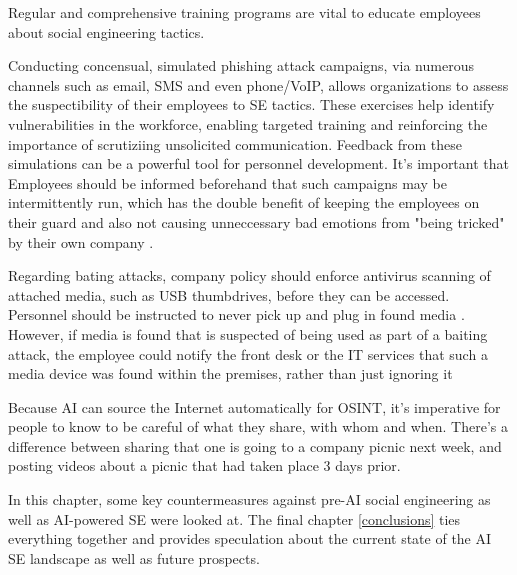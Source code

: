 Regular and comprehensive training programs are vital to educate employees about social engineering tactics.

Conducting concensual, simulated phishing attack campaigns, via numerous channels such as email, SMS and even phone/VoIP, allows organizations to assess the suspectibility of their employees to SE tactics. These exercises help identify vulnerabilities in the workforce, enabling targeted training and reinforcing the importance of scrutiziing unsolicited communication. Feedback from these simulations can be a powerful tool for personnel development. It's important that Employees should be informed beforehand that such campaigns may be intermittently run, which has the double benefit of keeping the employees on their guard and also not causing unneccessary bad emotions from "being tricked" by their own company \citep{hadnagySocialEngineering2018, mitnickArtDeceptionControlling2003}.

Regarding bating attacks, company policy should enforce antivirus scanning of attached media, such as USB thumbdrives, before they can be accessed. Personnel should be instructed to never pick up and plug in found media \citep{salahdine_social_2019}. However, if media is found that is suspected of being used as part of a baiting attack, the employee could notify the front desk or the IT services that such a media device was found within the premises, rather than just ignoring it 

Because AI can source the Internet automatically for OSINT, it's imperative for people to know to be careful of what they share, with whom and when. There's a difference between sharing that one is going to a company picnic next week, and posting videos about a picnic that had taken place 3 days prior.



In this chapter, some key countermeasures against pre-AI social engineering as well as AI-powered SE were looked at. The final chapter \ref{conclusions} ties everything together and provides speculation about the current state of the AI SE landscape as well as future prospects.

